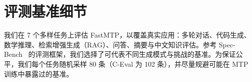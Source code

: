 \documentclass{article} %
\begin{document}


\section{评测基准细节} \label{app:bench}

我们在 7 个多样任务上评估 FastMTP，以覆盖真实应用：多轮对话、代码生成、数学推理、检索增强生成（RAG）、问答、摘要与中文知识评估。参考 Spec-Bench~\citep{xia2024unlocking} 的评测框架，我们选择了可代表不同生成模式与挑战的基准。为保证公平，我们每个任务随机采样 80 条（C-Eval 为 102 条），并尽量规避可能在 MTP 训练中暴露过的基准。
\end{document}
